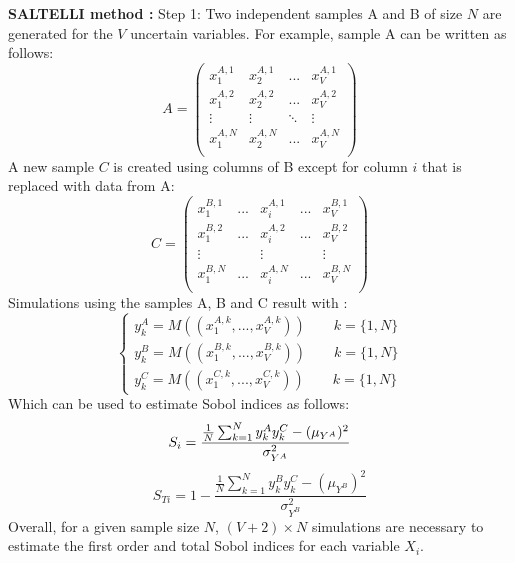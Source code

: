 \textbf{SALTELLI method \cite{bib16}:}
Step 1:
Two independent samples A and B of size $N$ are generated for the $V$ uncertain variables. For example, sample A can be written as follows:
\begin{equation}
A = \begin{pmatrix}
x_{1}^{A,1} & x_{2}^{A,1} & ... & x_{V}^{A,1} \\
x_{1}^{A,2} & x_{2}^{A,2} & ... & x_{V}^{A,2} \\
 \vdots & \vdots & \ddots & \vdots \\
x_{1}^{A,N} & x_{2}^{A,N} & ... & x_{V}^{A,N} \\
\end{pmatrix}
\end{equation}
A new sample $C$ is created using columns of B except for column $i$ that is replaced with data from A:
\begin{equation}
C = \begin{pmatrix}
x_{1}^{B,1} & ... & x_{i}^{A,1} &... & x_{V}^{B,1} \\
x_{1}^{B,2} & ... & x_{i}^{A,2} &... & x_{V}^{B,2} \\
 \vdots &  & \vdots & & \vdots \\
x_{1}^{B,N} & ... & x_{i}^{A,N} &... & x_{V}^{B,N} \\
\end{pmatrix}
\end{equation}
Simulations using the samples A, B and C result with :
\begin{equation}
\left\{
	\begin{array}{rcr}
	y_k^A = M((x_{1}^{A,k}, ..., x_{V}^{A,k})) \qquad k=\{1,N\} \\
	y_k^B = M((x_{1}^{B,k}, ..., x_{V}^{B,k})) \qquad k=\{1,N\} \\
	y_k^C = M((x_{1}^{C,k}, ..., x_{V}^{C,k})) \qquad k=\{1,N\}
	\end{array}
\right.
\end{equation}
Which can be used to estimate Sobol indices as follows:
\begin{equation}
S_i = \dfrac{\frac{1}{N}\sum_{k=1}^N y_k^A y_k^C - (\mu_{Y^A})^2}{\sigma_{Y^A}^2}
\vspace{-0.2cm}
\end{equation}
\begin{equation}
S_{Ti} = 1-\dfrac{\frac{1}{N}\sum_{k=1}^N y_k^B y_k^C - (\mu_{Y^B})^2}{\sigma_{Y^B}^2}
\end{equation}
Overall, for a given sample size $N$, $(V + 2)\times N$ simulations are necessary to estimate the first order and total Sobol indices for each variable $X_i$. \\


